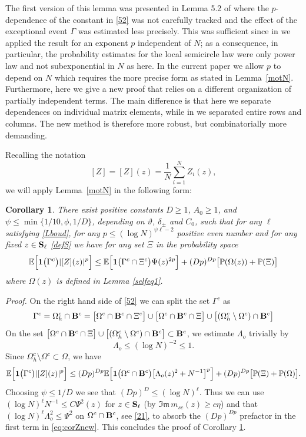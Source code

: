 \documentclass[draft]{article}
\newcommand{\ttau}{\vartheta}
\newcommand{\be}{\begin{equation}}
\newcommand{\ee}{\end{equation}}
\newcommand{\barZ}{ {[ Z ]}}
\newcommand{\im}{{\mathfrak{Im} \, }}
\newcommand{\E}{{\mathbb E }}
\renewcommand{\P}{{\mathbb P}}
\newcommand{\bS}{ {\bf  S}}
\newtheorem{corollary}[theorem]{Corollary}
\newcommand{\qed}{\hfill\fbox{}\par\vspace{0.3mm}}
\numberwithin{equation}{section}
\numberwithin{theorem}{section}
\numberwithin{definition}{section}
\numberwithin{remark}{section}
\begin{document}
 The first version of this lemma was presented in Lemma 5.2 of \cite{EYY2}
where the $p$-dependence of the constant in \eqref{52} was not carefully tracked
and the effect of the exceptional event $\Gamma$ was estimated less
precisely. This was sufficient since in \cite{EYY2} we applied the result for 
an exponent $p$ independent of $N$; as a consequence, in particular, the
probability estimates for the local semicircle law
were only power law and not subexponential in $N$ as here.
In the current paper we allow $p$ to depend
on $N$ which requires the more precise form as stated in Lemma~\ref{motN}.
Furthermore, here we give a new proof that relies on a
different organization of partially independent terms.
 The main difference
is that here we separate dependences on individual
matrix elements, while in \cite{EYY2} we separated
entire rows and columns. The new method is therefore
more robust, but combinatorially more demanding.



\medskip
Recalling the notation 
$$
   \barZ = \barZ(z)= \frac{1}{N}\sum_{i=1}^N Z_i(z),
$$
we will apply Lemma~\ref{motN} in the following form:


\begin{corollary}\label{corZ}  There exist positive constants $D\ge 1$, $A_0\ge 1$, 
 and $\psi \le \min\{ 1/10, \phi, 1/D\}$,
depending on $\ttau$, $\delta_\pm$ and $C_0$,
 such that for any
 $\ell$ satisfying \eqref{Lboud},
for any $p\le (\log N)^{\psi \ell-2}$  positive even  
number and
for any fixed $z\in\bS_\ell$ \eqref{defS} 
we have  for any set $\Xi$ in the probability space 
\be\label{eq:corZ}
\E \Big[ {\bf 1}\big(\Gamma^c\big)|\barZ(z)|^p\Big] \le  
  \E \Big[ {\bf 1}\big(\Gamma^c\cap \Xi^c\big) \Psi(z)^{2p}\Big]+  (Dp)^{D p} 
 \big [\P(\Omega(z)) + \P (\Xi)  \big ]
\ee
where $\Omega(z)$ is defined in Lemma \ref{selfeq1}.
\end{corollary}


{\it Proof.}  On the right hand side of \eqref{52} we can split the set $\Gamma^c$
as
$$
  \Gamma^c = \Omega_h^c \cap {\bf B}^c =
\big [ \Omega^c \cap {\bf B}^c \cap \Xi^c \big ] \cup \big [ \Omega^c \cap {\bf B}^c \cap \Xi \big ]
 \cup \big[ (\Omega_h^c\setminus\Omega^c) \cap {\bf B}^c \big]
$$
On the set $\big [ \Omega^c \cap {\bf B}^c \cap \Xi \big ]
 \cup \big[ (\Omega_h^c\setminus\Omega^c) \cap {\bf B}^c \big]
 \subset {\bf B}^c$, we  estimate $\Lambda_o$ trivially by
\be\label{x1}
\Lambda_o\le (\log N)^{-2}\le 1. 
\ee
Since $\Omega_h^c\setminus\Omega^c \subset \Omega$,  we have 
\be\label{eq:corZnew}
\E \Big[ {\bf 1}\big(\Gamma^c\big)|\barZ(z)|^p\Big] \le  
 (Dp)^{Dp}
  \E \Big[ {\bf 1}\big(\Omega^c \cap {\bf B}^c   \big) 
 \big[ \Lambda_o(z)^{2} + N^{-1}\big]^{p}\Big] + (Dp)^{Dp}  
   \big [ \P (\Xi)  +\P(\Omega)  \big ].
\ee 
Choosing $\psi\le 1/D$ we see that $(Dp)^D\le (\log N)^\ell$. Thus
we can use
 $(\log N)^\ell N^{-1} \le C\Psi^2(z)$ 
for $z\in \bS_\ell$ (by $\im m_{sc}(z)\ge c\eta$) and that  $(\log N)^\ell\Lambda_o^2\le \Psi^2$ on 
$\Omega^c\cap {\bf B}^c$, see \eqref{21}, to absorb the $(Dp)^{Dp}$ prefactor 
in the first term in \eqref{eq:corZnew}.
This concludes the proof of Corollary \ref{corZ}. \qed
\end{document}
